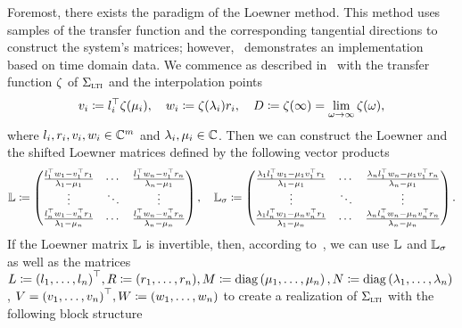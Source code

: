 Foremost, there exists the paradigm of the Loewner method.
This method uses samples of the transfer function and the corresponding tangential directions to construct the system's matrices; however,~\cite{Peherstorfer2017} demonstrates an implementation based on time domain data.
We commence as described in~\cite{BGD2020} with the transfer function $\zeta$ of $\Sigma_{\textnormal{\scshape lti}}$ and the interpolation points
\begin{equation*}
    v_i \coloneqq l_i^{\top} \zeta(\mu_i),\quad w_i \coloneqq \zeta(\lambda_i) r_i,\quad D\coloneqq \zeta(\infty) = \lim\limits_{\omega \to \infty} \zeta(\omega),
\end{equation*}
where $l_i, r_i, v_i, w_i \in \mathbb{C}^m$ and $\lambda_i, \mu_i \in \mathbb{C}$.
Then we can construct the Loewner and the shifted Loewner matrices defined by the following vector products
\begin{equation}\label{eq:loewner-matrices}
    \mathbb{L} \coloneqq \begin{pmatrix}
        \frac{l_1^{\top} w_1  - v_1^{\top} r_1}{\lambda_1 - \mu_1} & \cdots & \frac{l_1^{\top} w_n  - v_1^{\top} r_n}{\lambda_n - \mu_1} \\
        \vdots & \ddots & \vdots \\
        \frac{l_n^{\top} w_1  - v_n^{\top} r_1}{\lambda_1 - \mu_n} & \cdots & \frac{l_n^{\top} w_n  - v_n^{\top} r_n}{\lambda_n - \mu_n}
    \end{pmatrix},\quad \mathbb{L}_\sigma \coloneqq \begin{pmatrix}
        \frac{\lambda_1 l_1^{\top} w_1 - \mu_1 v_1^{\top} r_1}{\lambda_1 - \mu_1} & \cdots & \frac{\lambda_n l_1^{\top} w_n - \mu_1 v_1^{\top} r_n}{\lambda_n - \mu_1} \\
        \vdots & \ddots & \vdots \\
        \frac{\lambda_1 l_n^{\top} w_1 - \mu_n v_n^{\top} r_1}{\lambda_1 - \mu_n} & \cdots & \frac{\lambda_n l_n^{\top} w_n - \mu_n v_n^{\top} r_n}{\lambda_n - \mu_n}
    \end{pmatrix}.
\end{equation}
If the Loewner matrix $\mathbb{L}$ is invertible, then, according to~\cite[Theorem~5.1]{BGD2020}, we can use $\mathbb{L}$ and $\mathbb{L}_\sigma$ as well as the matrices $L \coloneqq {(l_1, \dots, l_n)}^{\top}, R \coloneqq (r_1, \dots, r_n), M \coloneqq \mathop{}\!\mathrm{diag}\left(\mu_1, \dots, \mu_n\right), N \coloneqq \mathop{}\!\mathrm{diag}\left(\lambda_1, \dots, \lambda_n\right)$, $V = {(v_1, \dots, v_n)}^{\top}, W \coloneqq (w_1, \dots, w_n)$ to create a realization of $\Sigma_{\textnormal{\scshape lti}}$ with the following block structure
